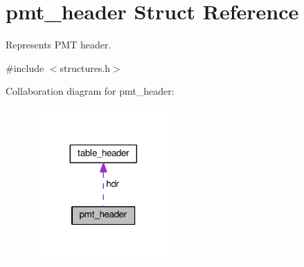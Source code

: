 \hypertarget{structpmt__header}{}\section{pmt\+\_\+header Struct Reference}
\label{structpmt__header}


Represents P\+MT header.  




{\ttfamily \#include $<$structures.\+h$>$}



Collaboration diagram for pmt\+\_\+header\+:\nopagebreak
\begin{figure}[H]
\begin{center}
\leavevmode
\includegraphics[width=152pt]{structpmt__header__coll__graph}
\end{center}
\end{figure}
